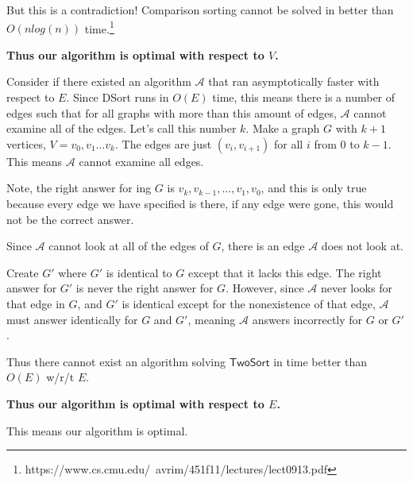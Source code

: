 \documentclass{article}
\newcommand{\sort}{$\mathsf{TwoSort}$ }
\begin{document}
But this is a contradiction!  Comparison sorting cannot be solved in better than $O(nlog(n))$ time.\footnote{https://www.cs.cmu.edu/~avrim/451f11/lectures/lect0913.pdf}

\bigskip

\textbf{Thus our algorithm is optimal with respect to $V$.}

\bigskip

Consider if there existed an algorithm $\mathcal{A}$ that ran asymptotically faster with respect to $E$.  Since DSort runs in $O(E)$ time, this means there is a number of edges such that for all graphs with more than this amount of edges, $\mathcal{A}$ cannot examine all of the edges.  Let's call this number $k$.  Make a graph $G$ with $k+1$ vertices,
$V = v_0, v_1 \hdots v_{k}$.  The edges are just $(v_i, v_{i+1})$ for all $i$ from $0$ to $k-1$.
This means $\mathcal{A}$ cannot examine all edges.

Note, the right answer for ing $G$ is $v_k, v_{k-1}, \hdots, v_1, v_0$, and this is only true because every edge we have specified is there, if any edge were gone, this would not be the correct answer.

Since $\mathcal{A}$ cannot look at all of the edges of $G$, there is an edge $\mathcal{A}$ does not look at.

Create $G'$ where $G'$ is identical to $G$ except that it lacks this edge.
The right answer for $G'$ is never the right answer for $G$.  However, since $\mathcal{A}$ never looks for that edge in $G$, and $G'$ is identical except for the nonexistence of that edge, $\mathcal{A}$ must answer identically for $G$ and $G'$, meaning $\mathcal{A}$ answers incorrectly for $G$ or $G'$.

Thus there cannot exist an algorithm solving \sort in time better than $O(E)$ w/r/t $E$.

\bigskip

\textbf{Thus our algorithm is optimal with respect to $E$.}

\bigskip

This means our algorithm is optimal.
\end{document}
